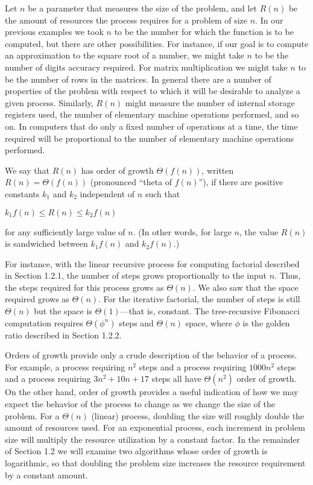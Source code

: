 Let $n$ be a parameter that measures the size of the problem, and let $R(n)$ be the amount of resources the process requires for a problem of size $n$. In our previous examples we took $n$ to be the number for which the function is to be computed, but there are other possibilities. For instance, if our goal is to compute an approximation to the square root of a number, we might take $n$ to be the number of digits accuracy required. For matrix multiplication we might take $n$ to be the number of rows in the matrices. In general there are a number of properties of the problem with respect to which it will be desirable to analyze a given process. Similarly, $R(n)$ might measure the number of internal storage registers used, the number of elementary machine operations performed, and so on. In computers that do only a fixed number of operations at a time, the time required will be proportional to the number of elementary machine operations performed.

We say that $R(n)$ has order of growth $\Theta(f(n))$, written $R(n) = \Theta(f(n))$ (pronounced ``theta of $f(n)$''), if there are positive constants $k_1$ and $k_2$ independent of $n$ such that

$k_1 f(n) \leq R(n) \leq k_2 f(n)$

for any sufficiently large value of $n$. (In other words, for large $n$, the value $R(n)$ is sandwiched between $k_1 f(n)$ and $k_2 f(n)$.)

For instance, with the linear recursive process for computing factorial described in Section 1.2.1, the number of steps grows proportionally to the input $n$. Thus, the steps required for this process grows as $\Theta(n)$. We also saw that the space required grows as $\Theta(n)$. For the iterative factorial, the number of steps is still $\Theta(n)$ but the space is $\Theta(1)$---that is, constant. The tree-recursive Fibonacci computation requires $\Theta(\phi^n)$ steps and $\Theta(n)$ space, where $\phi$ is the golden ratio described in Section 1.2.2.

Orders of growth provide only a crude description of the behavior of a process. For example, a process requiring $n^2$ steps and a process requiring $1000n^2$ steps and a process requiring $3n^2 + 10n + 17$ steps all have $\Theta(n^2)$ order of growth. On the other hand, order of growth provides a useful indication of how we may expect the behavior of the process to change as we change the size of the problem. For a $\Theta(n)$ (linear) process, doubling the size will roughly double the amount of resources used. For an exponential process, each increment in problem size will multiply the resource utilization by a constant factor. In the remainder of Section 1.2 we will examine two algorithms whose order of growth is logarithmic, so that doubling the problem size increases the resource requirement by a constant amount.

